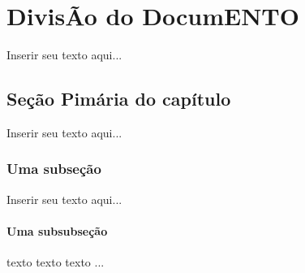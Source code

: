 %
%

\chapter{DivisÃo do DocumENTO}

Inserir seu texto aqui...

\section{Seção Pimária do capítulo}

Inserir seu texto aqui...

\subsection{Uma subseção}

Inserir seu texto aqui...

\subsubsection{Uma subsubseção}
texto texto texto ...
